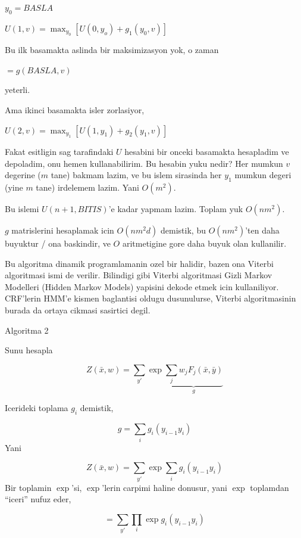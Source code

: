 \documentclass[12pt,fleqn]{article}\usepackage{../common}
\begin{document}
$y_0 = BASLA$

$U(1,v) = \max_{y_0} [ U(0,y_o) + g_1(y_0,v)]$

Bu ilk basamakta aslinda bir maksimizasyon yok, o zaman 

$ = g(BASLA,v)$

yeterli. 

Ama ikinci basamakta isler zorlasiyor, 

$U(2,v) = \max_{y_1} [ U(1,y_1) + g_2(y_1,v) ]$

Fakat esitligin sag tarafindaki $U$ hesabini bir onceki basamakta
hesapladim ve depoladim, onu hemen kullanabilirim. Bu hesabin yuku nedir? 
Her mumkun $v$ degerine ($m$ tane) bakmam lazim, ve bu islem sirasinda her
$y_1$ mumkun degeri (yine $m$ tane) irdelemem lazim. Yani $O(m^2)$. 

Bu islemi $U(n+1, BITIS)$'e kadar yapmam lazim. Toplam yuk $O(nm^2)$. 

$g$ matrislerini hesaplamak icin $O(nm^2d)$ demistik, bu  $O(nm^2)$'ten
daha buyuktur / ona baskindir, ve $O$ aritmetigine gore daha buyuk olan 
kullanilir. 

Bu algoritma dinamik programlamanin ozel bir halidir, bazen ona Viterbi
algoritmasi ismi de verilir. Bilindigi gibi Viterbi algoritmasi Gizli
Markov Modelleri (Hidden Markov Models) yapisini dekode etmek icin
kullaniliyor. CRF'lerin HMM'e kismen baglantisi oldugu dusunulurse, Viterbi
algoritmasinin burada da ortaya cikmasi sasirtici degil. 

Algoritma 2

Sunu hesapla

$$Z(\bar{x},w) = \sum_{y'} \exp 
\underbrace{\sum_j w_j F_j(\bar{x},\bar{y})}_{g}
$$

Icerideki toplama $g_i$ demistik, 

$$ g = \sum_i g_i(y_{i-1}y_i) $$
Yani


$$Z(\bar{x},w) = \sum_{y'} \exp 
\sum_i g_i(y_{i-1}y_i) 
$$
Bir toplamin $\exp$'si, $\exp$'lerin carpimi haline donusur, yani $\exp$
toplamdan ``iceri'' nufuz eder, 

$$
 = \sum_{y'} \prod_i \exp  g_i(y_{i-1}y_i) 
$$
\end{document}
